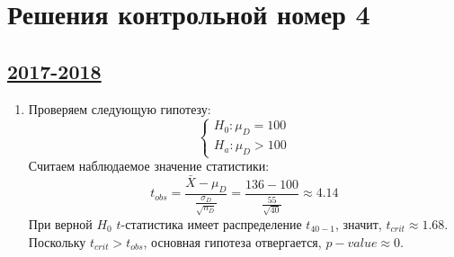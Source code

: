 \thispagestyle{empty}
\section{Решения контрольной номер 4}

\subsection[2017-2018]{\hyperref[sec:kr_04_2017_2018]{2017-2018}}
\label{sec:sol_kr_04_2017_2018}



\begin{enumerate}
\item Проверяем следующую гипотезу:
\[
\begin{cases}
H_0: \mu_{D} = 100 \\
H_a: \mu_{D} > 100
\end{cases}
\]
Считаем наблюдаемое значение статистики:
\[
t_{obs} = \frac{\bar X - \mu_{D}}{\frac{\sigma_D}{\sqrt{n_D}}} = \frac{136 - 100}{\frac{55}{\sqrt{40}}} \approx 4.14
\]
При верной $H_0$ $t$-статистика имеет распределение $t_{40 - 1}$, значит, $t_{crit} \approx 1.68$.
Поскольку $t_{crit} > t_{obs}$, основная гипотеза отвергается, $p-value \approx 0$.


\end{enumerate}

